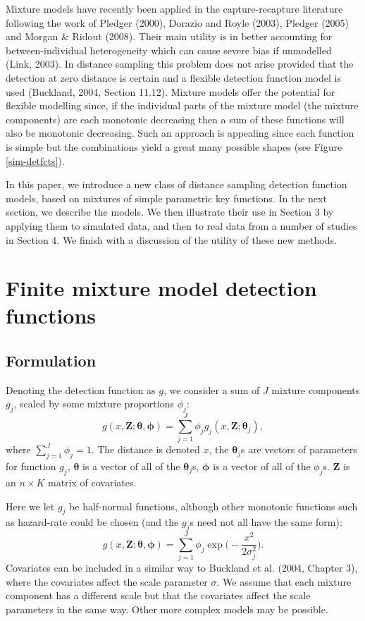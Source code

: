 \documentclass[useAMS,referee, usegraphicx]{biom}
\begin{document}
Mixture models have recently been applied in the capture-recapture literature following the work of Pledger (2000), Dorazio and Royle (2003), Pledger (2005) and Morgan \& Ridout (2008). Their main utility is in better accounting for between-individual heterogeneity which can cause severe bias if unmodelled (Link, 2003). In distance sampling this problem does not arise provided that the detection at zero distance is certain and a flexible detection function model is used (Buckland, 2004, Section 11.12). Mixture models offer the potential for flexible modelling since, if the individual parts of the mixture model (the mixture components) are each monotonic decreasing then a sum of these functions will also be monotonic decreasing. Such an approach is appealing since each function is simple but the combinations yield a great many possible shapes (see Figure \ref{sim-detfcts}).

In this paper, we introduce a new class of distance sampling detection function models, based on mixtures of simple parametric key functions.  In the next section, we describe the models.  We then illustrate their use in Section 3 by applying them to simulated data, and then to real data from a number of studies in Section 4. We finish with a discussion of the utility of these new methods.

\section{Finite mixture model detection functions}

\subsection{Formulation}
\label{s:detfcts}

Denoting the detection function as $g$, we consider a sum of $J$ mixture components $g_j$, scaled by some mixture proportions $\phi_j$:
\begin{equation*}
g(x,\mathbf{Z}; \bm{\theta}, \bm{\phi}) = \sum_{j=1}^J \phi_j g_j(x,\mathbf{Z}; \bm{\theta}_j),
\end{equation*}
where $\sum_{j=1}^J \phi_j = 1$. The distance is denoted $x$, the $\bm{\theta}_j$s are vectors of parameters for function $g_j$, $\bm{\theta}$ is a vector of all of the $\bm{\theta}_j$s, $\bm{\phi}$ is a vector of all of the $\phi_j$s. $\mathbf{Z}$ is an $n\times K$ matrix of covariates.

Here we let $g_j$ be half-normal functions, although other monotonic functions such as hazard-rate could be chosen (and the $g_j$s need not all have the same form):
\begin{equation*}
g(x,\mathbf{Z}; \bm{\theta}, \bm{\phi}) = \sum_{j=1}^J \phi_j \exp \Big( - \frac{x^2}{2\sigma_j^2} \Big).
\end{equation*}
Covariates can be included in a similar way to Buckland et al. (2004, Chapter 3), where the covariates affect the scale parameter $\sigma$. We assume that each mixture component has a different scale but that the covariates affect the scale parameters in the same way. Other more complex models may be possible.
\end{document}
